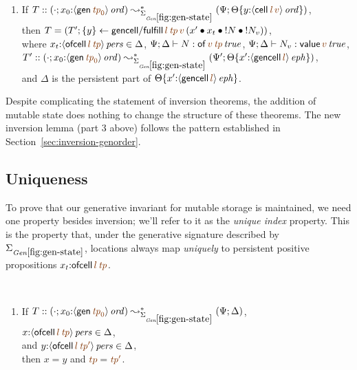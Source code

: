 \begin{lemma}
\begin{enumerate}
\medskip
\item If $T :: (\cdot; x_0{:}\istrue{\susp{{\sf gen}\,\lf{{\it tp}_0}}})
         \leadsto^*_{\siggenstate} 
         (\Psi; \tackon{\Theta}
            {y{:}\istrue{\susp{{\sf cell}\,\lf{{\it l}}\,\lf{v}}}})$,
\\ then $T = (T'; \trstep{y}{{\sf gencell/fulfill}\,\lf{l}\,\lf{\it tp}\,\lf{v}\,(\tfuser{x'}{\tfuser{x_t}{\tfuser{\tbangr{N}}{\tbangr{N_v}}}})})$,
\\ where $x_t{:}\ispers{\susp{{\sf ofcell}\,\lf{l}\,\lf{\it tp}}} \in \Delta$,
   $\Psi; \Delta \vdash N : \isconc{{\sf of}\,\lf{v}\,\lf{\it tp}}$,
   $\Psi; \Delta \vdash N_v : \isconc{{\sf value}\,\lf{v}}$,
\\ $T' :: (\cdot; x_0{:}\istrue{\susp{{\sf gen}\,\lf{{\it tp}_0}}})
       \leadsto^*_{\siggenstate}
       (\Psi'; \tackon{\Theta}
          {x'{:}\iseph{\susp{{\sf gencell}\,\lf{l}}}})$,
\\ and $\Delta$ is the persistent part of 
   $\tackon{\Theta}
          {x'{:}\iseph{\susp{{\sf gencell}\,\lf{l}}}}$.
\end{enumerate}
\end{lemma}
\bigskip

Despite complicating the statement of inversion theorems, the addition
of mutable state does nothing to change the structure 
of these theorems.
The new inversion lemma (part 3 above) follows the
pattern established in Section~\ref{sec:inversion-genorder}.

\subsection{Uniqueness}
\label{sec:uniqueness-genstate}

To prove that our generative invariant for mutable storage is
maintained, we need one property besides inversion; we'll refer to it
as the {\it unique index} property. This is the property that, under
the generative signature described by $\siggenstate$, locations always
map {\it uniquely} to persistent positive propositions $x_t{:}{\sf
  ofcell}\,\lf{l}\,\lf{\it tp}$.

\bigskip
\begin{lemma}~
\begin{enumerate}
\item
If $T :: (\cdot; x_0{:}\istrue{\susp{{\sf gen}\,\lf{{\it tp}_0}}})
         \leadsto^*_{\siggenstate}
         (\Psi; \Delta)$,
\\ ${x}{:}\ispers{\susp{{\sf ofcell}\,\lf{l}\,\lf{\it tp}}} \in \Delta$, 
\\ and 
${y}{:}\ispers{\susp{{\sf ofcell}\,\lf{l}\,\lf{{\it tp}'}}} \in \Delta$, 
\\ then $x = y$ and $\lf{tp} = \lf{{\it tp}'}$.
\end{enumerate}
\end{lemma}

